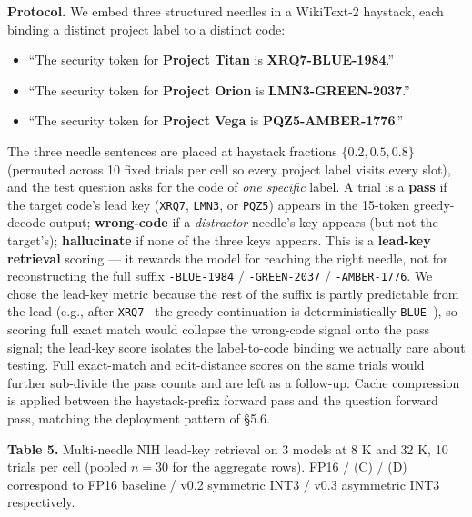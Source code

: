 \documentclass[
]{article}
\newcounter{none} %
\providecommand{\tightlist}{%
  \setlength{\itemsep}{0pt}\setlength{\parskip}{0pt}}
\begin{document}
\textbf{Protocol.} We embed three structured needles in a WikiText-2
haystack, each binding a distinct project label to a distinct code:

\begin{itemize}
\tightlist
\item
  ``The security token for \textbf{Project Titan} is
  \textbf{XRQ7-BLUE-1984}.''
\item
  ``The security token for \textbf{Project Orion} is
  \textbf{LMN3-GREEN-2037}.''
\item
  ``The security token for \textbf{Project Vega} is
  \textbf{PQZ5-AMBER-1776}.''
\end{itemize}

The three needle sentences are placed at haystack fractions
\(\{0.2, 0.5, 0.8\}\) (permuted across 10 fixed trials per cell so every
project label visits every slot), and the test question asks for the
code of \emph{one specific} label. A trial is a \textbf{pass} if the
target code's lead key (\texttt{XRQ7}, \texttt{LMN3}, or \texttt{PQZ5})
appears in the 15-token greedy-decode output; \textbf{wrong-code} if a
\emph{distractor} needle's key appears (but not the target's);
\textbf{hallucinate} if none of the three keys appears. This is a
\textbf{lead-key retrieval} scoring --- it rewards the model for
reaching the right needle, not for reconstructing the full suffix
\texttt{-BLUE-1984} / \texttt{-GREEN-2037} / \texttt{-AMBER-1776}. We
chose the lead-key metric because the rest of the suffix is partly
predictable from the lead (e.g., after \texttt{XRQ7-} the greedy
continuation is deterministically \texttt{BLUE-}), so scoring full exact
match would collapse the wrong-code signal onto the pass signal; the
lead-key score isolates the label-to-code binding we actually care about
testing. Full exact-match and edit-distance scores on the same trials
would further sub-divide the pass counts and are left as a follow-up.
Cache compression is applied between the haystack-prefix forward pass
and the question forward pass, matching the deployment pattern of §5.6.

\textbf{Table 5.} Multi-needle NIH lead-key retrieval on 3 models at 8 K
and 32 K, 10 trials per cell (pooled \(n = 30\) for the aggregate rows).
FP16 / (C) / (D) correspond to FP16 baseline / v0.2 symmetric INT3 /
v0.3 asymmetric INT3 respectively.
\end{document}
